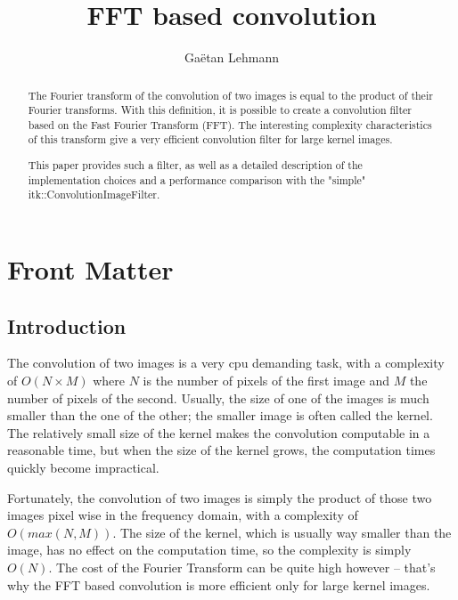 \documentclass{InsightArticle}
\title{FFT based convolution}
\author{Ga\"etan Lehmann}
\newcommand{\IJhandlerIDnumber}{3154}
\begin{document}
%
% 
\IJhandlefooter{\IJhandlerIDnumber}

\maketitle

\ifhtml
\chapter*{Front Matter\label{front}}
\fi


\begin{abstract}
\noindent

The Fourier transform of the convolution of two images is equal to the product of their
Fourier transforms. With this definition, it is possible to create a convolution filter
based on the Fast Fourier Transform (FFT). The interesting complexity characteristics of
this transform give a very efficient convolution filter for large kernel images.

This paper provides such a filter, as well as a detailed description of the implementation
choices and a performance comparison with the "simple" itk::ConvolutionImageFilter.

\end{abstract}

\IJhandlenote{\IJhandlerIDnumber}

\tableofcontents

\section{Introduction}

The convolution of two images is a very cpu demanding task, with a complexity of $O(N \times M)$ where $N$ is
the number of pixels of the first image and $M$ the number of pixels of the second. Usually, the size
of one of the images is much smaller than the one of the other; the smaller image is often called the
kernel. The relatively small size of the kernel makes the convolution computable in a reasonable time,
but when the size of the kernel grows, the computation times quickly become impractical.

Fortunately, the convolution of two images is simply the product of those two images pixel wise in
the frequency domain, with a complexity of $O(max(N, M))$. The size of the kernel, which is usually
way smaller than the image, has no effect on the computation time, so the complexity is simply $O(N)$.
The cost of the Fourier Transform
can be quite high however -- that's why the FFT based convolution is more efficient only for large
kernel images.
\end{document}
